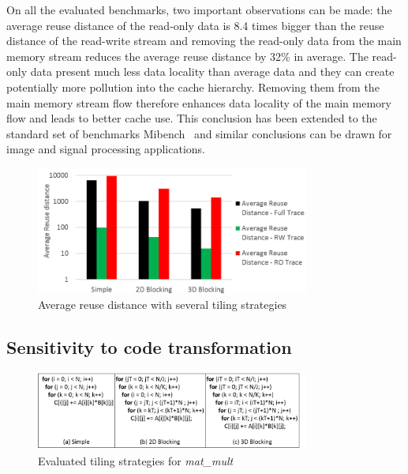 \documentclass[sigconf]{acmart}
\begin{document}
On all the evaluated benchmarks, two important observations can be made: the average reuse distance of the read-only data is 8.4 times bigger than the reuse distance of the read-write stream and removing the read-only data from the main memory stream reduces the average reuse distance by 32\% in average. The read-only data present much less data locality than average data and they can create potentially more pollution into the cache hierarchy. Removing them from the main memory stream flow therefore enhances data locality of the main memory flow and leads to better cache use. This conclusion has been extended to the standard set of benchmarks Mibench~\cite{vaumourin:2014} and similar conclusions can be drawn for image and signal processing applications. 


\begin{figure}
    \centering
    \includegraphics[width=9cm]{./images/blocking1.png}
     \caption{Average reuse distance with several tiling strategies}
    \label{blocking}
\end{figure}

\subsection{Sensitivity to code transformation}
\begin{figure}
    \centering
    \includegraphics[width=9cm]{./images/matmul.png}
     \caption{Evaluated tiling strategies for \textit{mat\_mult}}
    \label{matmul}
\end{figure}
\end{document}
